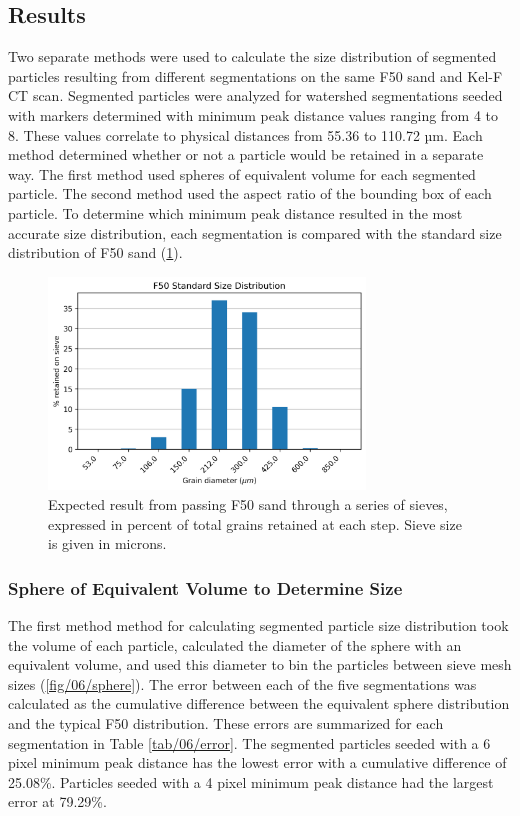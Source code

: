 \subsection{Results}
Two separate methods were used to calculate the size distribution of
segmented particles resulting from different segmentations on the
same F50 sand and Kel-F CT scan.
Segmented particles were analyzed for watershed segmentations seeded with
markers determined with minimum peak distance values ranging from 4 to 8.
These values correlate to physical distances from 55.36 to 110.72 µm.
Each method determined whether or not a particle would be retained in a
separate way.
The first method
used spheres of equivalent volume for each segmented particle. The second
method used the aspect ratio of the bounding box of each particle.
To determine which minimum peak distance resulted in the most accurate size
distribution, each segmentation is compared with the
standard size distribution of F50 sand (\ref{fig/06/f50}).

\begin{figure}[ht]
    \centering
    \includegraphics[width=0.75\textwidth]{figures/06/03-f50-size.png}
    \caption{
        \small{}
        Expected result from passing F50 sand through a series of sieves,
        expressed in percent of total grains retained at each step. Sieve
        size is given in microns.
    }
    \label{fig/06/f50}
\end{figure}

\subsubsection{Sphere of Equivalent Volume to Determine Size}
The first method method for calculating segmented particle size distribution
took the volume of each particle,
calculated the diameter of the sphere with an equivalent volume, and used this
diameter to bin the particles between sieve mesh sizes
(\ref{fig/06/sphere}). The error between each
of the five segmentations was calculated as the cumulative difference between
the equivalent sphere distribution and the typical F50 distribution. These
errors are summarized for each segmentation in Table \ref{tab/06/error}.
The segmented particles seeded with a 6 pixel minimum peak distance has the
lowest error with a cumulative difference of 25.08\%. Particles seeded with
a 4 pixel minimum peak distance had the largest error at 79.29\%.

